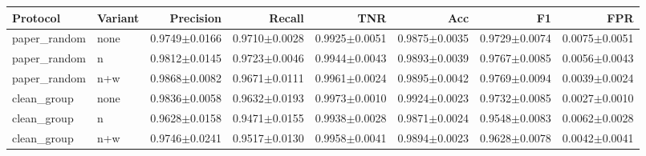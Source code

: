 \begin{tabular}{@{}llrrrrrr@{}}
\toprule
Protocol & Variant & Precision & Recall & TNR & Acc & F1 & FPR \\ \midrule
paper\_random & none & 0.9749$\pm$0.0166 & 0.9710$\pm$0.0028 & 0.9925$\pm$0.0051 & 0.9875$\pm$0.0035 & 0.9729$\pm$0.0074 & 0.0075$\pm$0.0051 \\
paper\_random & n & 0.9812$\pm$0.0145 & 0.9723$\pm$0.0046 & 0.9944$\pm$0.0043 & 0.9893$\pm$0.0039 & 0.9767$\pm$0.0085 & 0.0056$\pm$0.0043 \\
paper\_random & n+w & 0.9868$\pm$0.0082 & 0.9671$\pm$0.0111 & 0.9961$\pm$0.0024 & 0.9895$\pm$0.0042 & 0.9769$\pm$0.0094 & 0.0039$\pm$0.0024 \\
clean\_group & none & 0.9836$\pm$0.0058 & 0.9632$\pm$0.0193 & 0.9973$\pm$0.0010 & 0.9924$\pm$0.0023 & 0.9732$\pm$0.0085 & 0.0027$\pm$0.0010 \\
clean\_group & n & 0.9628$\pm$0.0158 & 0.9471$\pm$0.0155 & 0.9938$\pm$0.0028 & 0.9871$\pm$0.0024 & 0.9548$\pm$0.0083 & 0.0062$\pm$0.0028 \\
clean\_group & n+w & 0.9746$\pm$0.0241 & 0.9517$\pm$0.0130 & 0.9958$\pm$0.0041 & 0.9894$\pm$0.0023 & 0.9628$\pm$0.0078 & 0.0042$\pm$0.0041 \\
\bottomrule
\end{tabular}
